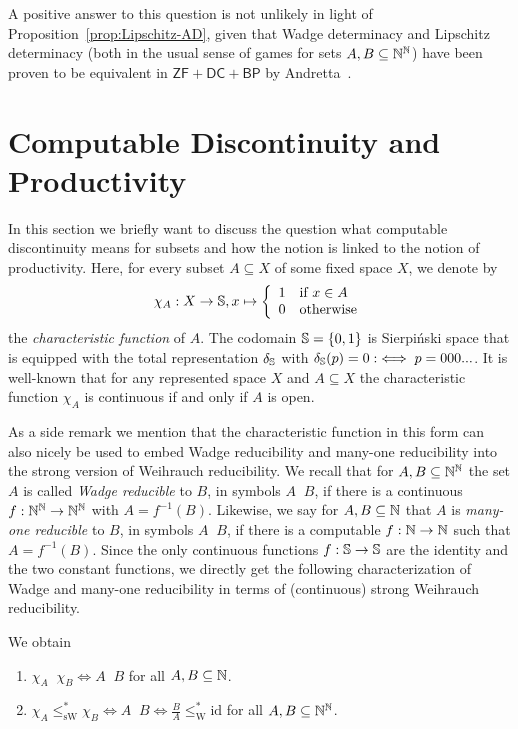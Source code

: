 \documentclass{amsart}
\def\IN{{\Bbb{N}}}
\def\IS{{\Bbb{S}}}
\def\In{\subseteq}
\def\leqm{\mathop{\leq_{\mathrm{m}}}}
\def\leqW{\mathop{\leq_{\mathrm{W}}}}
\def\leqSW{\mathop{\leq_{\mathrm{sW}}}}
\def\leqm{\mathop{\leq_{\mathrm{m}}}}
\def\leqW{\mathop{\leq_{\mathrm{W}}}}
\def\leqSW{\mathop{\leq_{\mathrm{sW}}}}
\def\id{{\mathrm{id}}}
\def\ZF{\mathsf{ZF}}
\def\DC{\mathsf{DC}}
\def\BP{\mathsf{BP}}
\begin{document}
A positive answer to this question is not unlikely in light of Proposition~\ref{prop:Lipschitz-AD}, 
given that Wadge determinacy and Lipschitz determinacy
(both in the usual sense of games for sets $A,B\In\IN^\IN$) have been proven to be equivalent in
$\ZF+\DC+\BP$ by Andretta~\cite{And03,And06}.


\section{Computable Discontinuity and Productivity}
\label{sec:characteristic}

In this section we briefly want to discuss the question what computable discontinuity means for subsets and how
the notion is linked to the notion of productivity.
Here, for every subset $A\In X$ of some fixed space $X$, we denote by
\[\chi_A:X\to\IS,x\mapsto\left\{\begin{array}{ll}
1 & \mbox{if $x\in A$}\\
0 & \mbox{otherwise}
\end{array}\right.\]
the {\em characteristic function} of $A$.
The codomain $\IS=\{0,1\}$ is Sierpi\'nski space that is equipped with the total representation
$\delta_\IS$ with $\delta_\IS(p)=0:\iff p=000...$. 
It is well-known that for any represented space $X$ and $A\In X$ the characteristic function
$\chi_A$ is continuous if and only if $A$ is open.

As a side remark we mention that the characteristic function in this form can also nicely be used to embed Wadge reducibility and many-one reducibility
into the strong version of Weihrauch reducibility.
We recall that for $A,B\In\IN^\IN$ the set $A$ is called {\em Wadge reducible} to $B$, in symbols $A\leqW B$, if there is a continuous
$f:\IN^\IN\to\IN^\IN$ with $A=f^{-1}(B)$. Likewise, we say for $A,B\In\IN$ that $A$ is {\em many-one reducible} to $B$,
in symbols $A\leqm B$, if there is a computable $f:\IN\to\IN$ such that $A=f^{-1}(B)$. Since the only continuous functions $f:\IS\to\IS$ are the identity and the two constant functions, we directly get the following characterization of Wadge and many-one reducibility in terms of (continuous) strong Weihrauch reducibility.

\begin{proposition}[Reducibilities]
We obtain
\begin{enumerate}
\item $\chi_A\leqSW\chi_B\iff A\leqm B$ for all $A,B\In\IN$.
\item $\chi_A\leq_\mathrm{sW}^*\chi_B\iff A\leqW B\iff \frac{B}{A}\leq_\mathrm{W}^*\id$ for all $A,B\In\IN^\IN$.
\end{enumerate}
\end{proposition}
\end{document}
